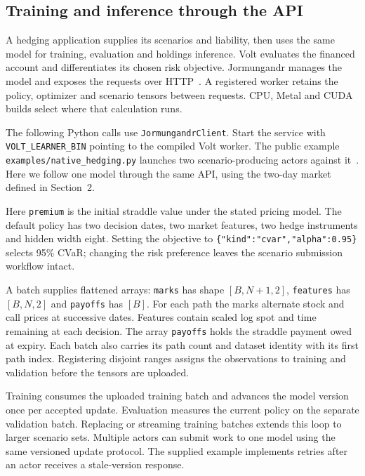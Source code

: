 \documentclass[8pt]{strategynet-journal}
\begin{document}
\clearpage
\begin{SNcolumns}
\section{Training and inference through the API}
A hedging application supplies its scenarios and liability, then uses the
same model for training, evaluation and holdings inference. Volt evaluates
the financed account and differentiates its chosen risk objective.
Jormungandr manages the model and exposes the requests over HTTP~\cite{volt,jorm}.
A registered worker retains the policy, optimizer and scenario tensors
between requests. CPU, Metal and CUDA builds select where that calculation runs.

The following Python calls use \texttt{JormungandrClient}. Start the service
with \texttt{VOLT\_LEARNER\_BIN} pointing to the compiled Volt worker.
The public example \texttt{examples/native\_hedging.py} launches two
scenario-producing actors against it~\cite{jorm}. Here we follow one model
through the same API, using the two-day market defined in Section~2.



Here \texttt{premium} is the initial straddle value under the stated pricing
model. The default policy has two decision dates, two market features, two
hedge instruments and hidden width eight. Setting the objective to
\texttt{\{"kind":"cvar","alpha":0.95\}} selects 95\% CVaR; changing the
risk preference leaves the scenario submission workflow intact.

A batch supplies flattened arrays: \texttt{marks} has shape
$[B,N+1,2]$, \texttt{features} has $[B,N,2]$ and \texttt{payoffs} has $[B]$.
For each path the marks alternate stock and call prices at successive dates.
Features contain scaled log spot and time remaining at each decision.
The array \texttt{payoffs} holds the straddle payment owed at expiry.
Each batch also carries its path count and dataset identity with its first
path index. Registering disjoint ranges assigns the observations to training
and validation before the tensors are uploaded.





Training consumes the uploaded training batch and advances the model version
once per accepted update. Evaluation measures the current policy on the
separate validation batch. Replacing or streaming training batches extends
this loop to larger scenario sets. Multiple actors can submit work to one
model using the same versioned update protocol. The supplied example
implements retries after an actor receives a stale-version response.


\end{SNcolumns}
\end{document}
